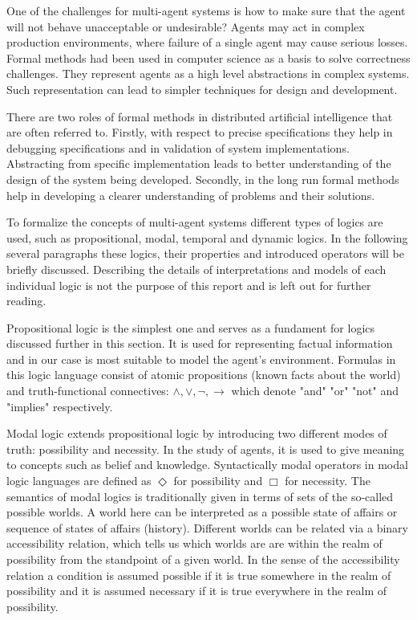 One of the challenges for multi-agent systems is how to make sure that the agent will not behave unacceptable or undesirable? Agents may act in complex production environments, where failure of a single agent may cause serious losses. Formal methods had been used in computer science as a basis to solve correctness challenges. They represent agents as a high level abstractions in complex systems. Such representation can lead to simpler techniques for design and development.

There are two roles of formal methods in distributed artificial intelligence that are often referred to. Firstly, with respect to precise specifications they help in debugging specifications and in validation of system implementations. Abstracting from specific implementation leads to better understanding of the design of the system being developed. Secondly, in the long run formal methods help in developing a clearer understanding of problems and their solutions. \cite{Singh_99}

To formalize the concepts of multi-agent systems different types of logics are used, such as propositional, modal, temporal and dynamic logics. In the following several paragraphs these logics, their properties and introduced operators will be briefly discussed. Describing the details of interpretations and models of each individual logic is not the purpose of this report and is left out for further reading.

Propositional logic is the simplest one and serves as a fundament for logics discussed further in this section. It is used for representing factual information and in our case is most suitable to model the agent's environment. Formulas in this logic language consist of atomic propositions (known facts about the world) and truth-functional connectives: $\land,\lor,\neg,\rightarrow$ which denote "and" "or" "not" and "implies" respectively. \cite{Enderton_72}

Modal logic extends propositional logic by introducing two different modes of truth: possibility and necessity. In the study of agents, it is used to give
meaning to concepts such as belief and knowledge. Syntactically modal operators in modal logic languages are defined as $\Diamond$  for possibility and
$\Box$ for necessity. The semantics of modal logics is traditionally given in terms of sets of the so-called possible worlds. A world here can be interpreted as a possible state of affairs or sequence of states of affairs (history). Different worlds can be related via a binary accessibility relation, which tells us which worlds are are within the realm of possibility from the standpoint of a given world. In the sense of the accessibility relation a condition is assumed possible if it is true somewhere in the realm of possibility and it is assumed necessary if it is true everywhere in the realm of possibility. \cite{Saul_63}

